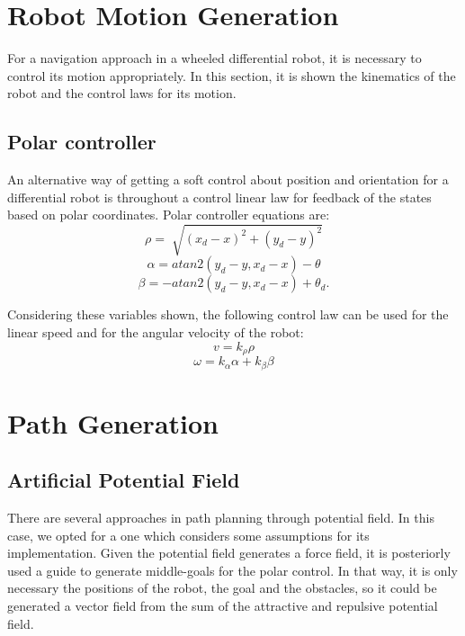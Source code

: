 \documentclass[conference]{IEEEtran}
\begin{document}
\section{Robot Motion Generation}
\label{sec:robot_motion}
For a navigation approach in a wheeled differential robot, it is necessary to control its motion appropriately. In this section, it is shown the kinematics of the robot and the control laws for its motion.

\subsection{Polar controller}


An alternative way of getting a soft control about position and orientation for a differential robot is throughout a control linear law for feedback  of the states based on polar coordinates. Polar controller equations are:
\begin{equation}
	\rho = \sqrt[]{(x_{d} - x)^2 + (y_{d} - y)^2} 
\end{equation}
\begin{equation}
	\alpha = atan2(y_{d} - y, x_{d} - x) - \theta 
\end{equation}
\begin{equation}
	\beta = -atan2(y_{d} - y, x_{d} - x) + \theta_{d}.
\end{equation}

Considering these variables shown, the following control law can be used for the linear speed and for the angular velocity of the robot:
\begin{equation}
	v = k_{\rho}\rho
\end{equation}
\begin{equation}
	\omega = k_{\alpha}\alpha + k_{\beta}\beta
\end{equation}


\section{Path Generation}
\label{sec:APF}
\subsection{Artificial Potential Field}
There are several approaches in path planning through potential field. In this case, we opted for a one which considers some assumptions for its implementation. Given the potential field generates a force field, it is posteriorly used a guide to generate middle-goals for the polar control. In that way, it is only necessary the positions of the robot, the goal and the obstacles, so it could be generated a vector field from the sum of the attractive  and repulsive potential field.\\
\end{document}
